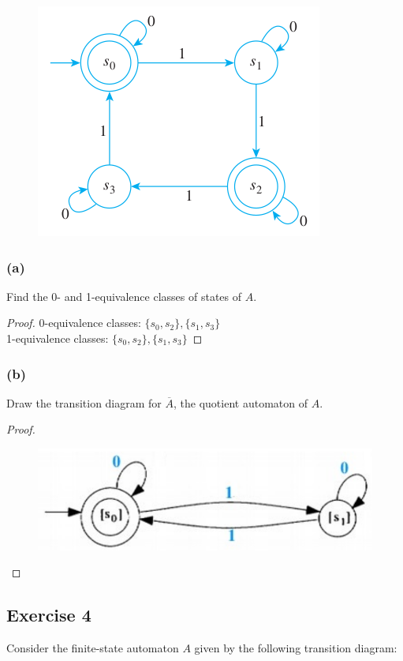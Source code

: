 \documentclass[14pt]{extarticle}
\begin{document}
\begin{figure}[ht!]
\centering
\includegraphics[scale=0.5]{../images/12.3.3.png}
\end{figure}

\subsubsection{(a)}
Find the 0- and 1-equivalence classes of states of \(A\).
\begin{proof}
0-equivalence classes: \(\{s_0, s_2\}, \{s_1, s_3\}\) \\
1-equivalence classes: \(\{s_0, s_2\}, \{s_1, s_3\}\)
\end{proof}

\subsubsection{(b)}
Draw the transition diagram for \(\overline{A}\), the quotient automaton of \(A\).

\begin{proof}
\begin{figure}[ht!]
\centering
\includegraphics[scale=0.4]{../images/12.3.3.b.png}
\end{figure}
\end{proof}

\subsection{Exercise 4}
Consider the finite-state automaton \(A\) given by the following transition diagram:
\end{document}
